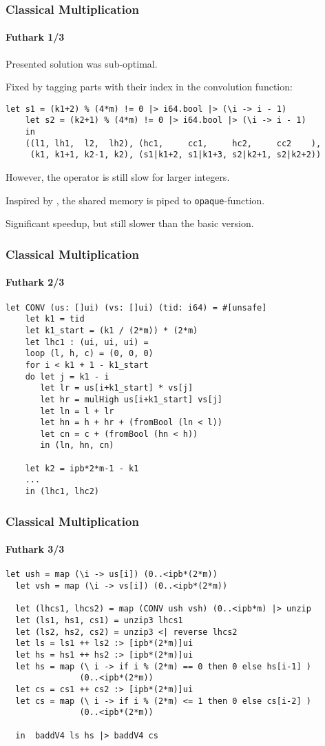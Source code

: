 \begin{frame}[fragile]
  \frametitle{Classical Multiplication}
  \framesubtitle{Futhark 1/3}
  Presented solution was sub-optimal.

  Fixed by tagging parts with their index in the convolution function:

  \begin{lstlisting}[language=futhark,basicstyle=\scriptsize,gobble=4,frame=single]
    let s1 = (k1+2) % (4*m) != 0 |> i64.bool |> (\i -> i - 1)
    let s2 = (k2+1) % (4*m) != 0 |> i64.bool |> (\i -> i - 1)
    in
    ((l1, lh1,  l2,  lh2), (hc1,     cc1,     hc2,     cc2    ),
     (k1, k1+1, k2-1, k2), (s1|k1+2, s1|k1+3, s2|k2+1, s2|k2+2))
   \end{lstlisting}\pause

   However, the operator is still slow for larger integers.

   Inspired by \cite{oancea2024gpu}, the shared memory is piped to
   \texttt{opaque}-function.\pause

   Significant speedup, but still slower than the basic version.
\end{frame}


\begin{frame}[fragile]
  \frametitle{Classical Multiplication}
  \framesubtitle{Futhark 2/3}
  \begin{lstlisting}[language=futhark,basicstyle=\scriptsize,gobble=2,frame=single]
  let CONV (us: []ui) (vs: []ui) (tid: i64) = #[unsafe]
    let k1 = tid
    let k1_start = (k1 / (2*m)) * (2*m)
    let lhc1 : (ui, ui, ui) =
    loop (l, h, c) = (0, 0, 0)
    for i < k1 + 1 - k1_start
    do let j = k1 - i
       let lr = us[i+k1_start] * vs[j]
       let hr = mulHigh us[i+k1_start] vs[j]
       let ln = l + lr
       let hn = h + hr + (fromBool (ln < l))
       let cn = c + (fromBool (hn < h))
       in (ln, hn, cn)

    let k2 = ipb*2*m-1 - k1
    ...
    in (lhc1, lhc2)
   \end{lstlisting}
\end{frame}


\begin{frame}[fragile]
  \frametitle{Classical Multiplication}
  \framesubtitle{Futhark 3/3}
\begin{lstlisting}[language=futhark,basicstyle=\scriptsize,gobble=2,frame=single]
  let ush = map (\i -> us[i]) (0..<ipb*(2*m))
  let vsh = map (\i -> vs[i]) (0..<ipb*(2*m))

  let (lhcs1, lhcs2) = map (CONV ush vsh) (0..<ipb*m) |> unzip
  let (ls1, hs1, cs1) = unzip3 lhcs1
  let (ls2, hs2, cs2) = unzip3 <| reverse lhcs2
  let ls = ls1 ++ ls2 :> [ipb*(2*m)]ui
  let hs = hs1 ++ hs2 :> [ipb*(2*m)]ui
  let hs = map (\ i -> if i % (2*m) == 0 then 0 else hs[i-1] )
               (0..<ipb*(2*m))
  let cs = cs1 ++ cs2 :> [ipb*(2*m)]ui
  let cs = map (\ i -> if i % (2*m) <= 1 then 0 else cs[i-2] )
               (0..<ipb*(2*m))

  in  baddV4 ls hs |> baddV4 cs
   \end{lstlisting}
\end{frame}

